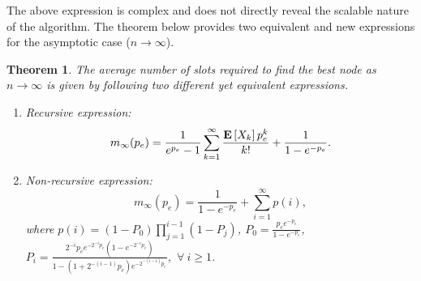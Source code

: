 \documentclass[12pt,draftcls,peerreview, onecolumn]{IEEEtran}
\newtheorem{theorem}{{\bf Theorem}}
\newcommand{\tendsto}{\to}
\newcommand{\expect}[1]{{\bf E}\left[{#1}\right]}
\newcommand{\EX}[1]{\expect{X_{#1}}}
\newcommand{\aveslots}[1]{m_{#1}}
\newcommand{\PI}[1]{P_{#1}}
\begin{document}
The above expression is complex and does not directly reveal the
scalable nature of the algorithm.  The theorem below provides two
equivalent and new expressions for the asymptotic case ($n \tendsto
\infty$).  
\begin{theorem}
  \label{m1}
  The average number of slots required to find the best node as
  $n\tendsto \infty$ is given by following two different yet
  equivalent expressions.
\begin{enumerate}
\item {\em Recursive expression:}
 \begin{equation}
 \aveslots{\infty}(p_e)  = \frac{1}{e^{p_e}-1}\sum_{k=1}^\infty \frac{\EX{k} p_e^k}{k!}  + \frac{1}{1-e^{-p_e}}.
\label{eq:m1}
 \end{equation}


\item {\em Non-recursive expression:}
\begin{equation}
\aveslots{\infty}(p_e)=\frac{1}{1-e^{-p_e}} + \sum_{i=1}^\infty p(i),
\label{eq:m2}
\end{equation}
where $p(i)= (1-P_0)\prod_{j=1}^{i-1} (1-\PI{j})$,
$P_0=\frac{p_e e^{-p_e}}{1-e^{-p_e}}$,
\mbox{$\PI{i}=\frac{2^{-i}p_ee^{-2^{-i}p_e}(1-e^{-2^{-i}p_e})}{1-(1+2^{-(i-1)}p_e)e^{-2^{-(i-1)}p_e}}$},~$\forall~i
\ge 1$.
\end{enumerate}
\end{theorem}
\end{document}
